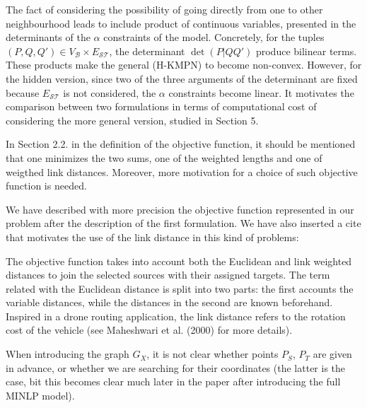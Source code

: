 \documentclass{article}
\newenvironment{reviewer}{\setcounter{pointcounter}{1}}{}
\newcommand{\point}{\text{{\selectfont \thepointcounter} \stepcounter{pointcounter}}}
\begin{document}
\begin{reviewer}
\begin{tcolorbox}[breakable,enhanced,coltitle=black,colback=green!5!white,colframe=green!75!black,title=\textbf{Answer R2.\point},borderline={1pt}{0pt}{black},boxrule=0pt]
			The fact of considering the possibility of going directly from one to other neighbourhood leads to include product of continuous variables, presented in the determinants of the $\alpha$ constraints of the model. Concretely, for the tuples $(P, Q, Q')\in V_\mathcal B\times E_{\mathcal S\mathcal T}$, the determinant $\det(P|QQ')$ produce bilinear terms. These products make the general (H-KMPN) to become non-convex. However, for the hidden version, since two of the three arguments of the determinant are fixed because $E_{\mathcal S\mathcal T}$ is not considered, the $\alpha$ constraints become linear. It motivates the comparison between two formulations in terms of computational cost of considering the more general version, studied in Section 5.
		\end{tcolorbox}
	
		\begin{itshape}
			In Section 2.2. in the definition of the objective function, it should be mentioned that one minimizes the two sums, one of the weighted lengths and one of weigthed link distances. Moreover, more motivation for a choice of such objective function is needed.
		\end{itshape}
		
		\begin{tcolorbox}[breakable,enhanced,coltitle=black,colback=green!5!white,colframe=green!75!black,title=\textbf{Answer R2.\point},borderline={1pt}{0pt}{black},boxrule=0pt]
			We have described with more precision the objective function represented in our problem after the description of the first formulation. We have also inserted a cite that motivates the use of the link distance in this kind of problems:
			\medskip
			
			The objective function takes into account both the Euclidean and link weighted distances to join the selected sources with their assigned targets. The term related with the Euclidean distance is split into two parts: the first accounts the variable distances, while the distances in the second are known beforehand. Inspired in a drone routing application, the link distance refers to the rotation cost of the vehicle (see Maheshwari et al. (2000) for more details).
			
		\end{tcolorbox}
	
		\begin{itshape}
			When introducing the graph $G_X$, it is not clear whether points $P_S$, $P_T$ are given in advance, or whether we are searching for their coordinates (the latter is the case, bit this becomes clear much later in the paper after introducing the full MINLP model). 
		\end{itshape}
	

\end{reviewer}
\end{document}
